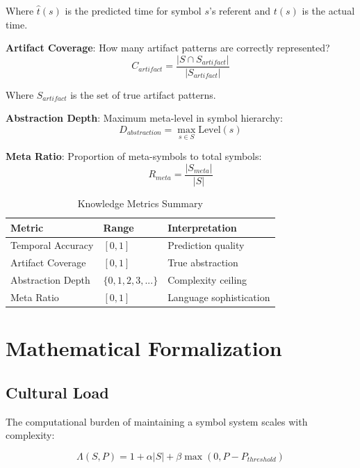 \documentclass[11pt,a4paper]{article}
\begin{document}
Where $\hat{t}(s)$ is the predicted time for symbol $s$'s referent and $t(s)$ is the actual time.

\textbf{Artifact Coverage}: How many artifact patterns are correctly represented?
\begin{equation}
C_{artifact} = \frac{|S \cap S_{artifact}|}{|S_{artifact}|}
\end{equation}

Where $S_{artifact}$ is the set of true artifact patterns.

\textbf{Abstraction Depth}: Maximum meta-level in symbol hierarchy:
\begin{equation}
D_{abstraction} = \max_{s \in S} \text{Level}(s)
\end{equation}

\textbf{Meta Ratio}: Proportion of meta-symbols to total symbols:
\begin{equation}
R_{meta} = \frac{|S_{meta}|}{|S|}
\end{equation}

\begin{table}[htbp]
\centering
\caption{Knowledge Metrics Summary}
\label{tab:knowledge_metrics}
\begin{tabular}{@{}lll@{}}
\toprule
\textbf{Metric} & \textbf{Range} & \textbf{Interpretation} \\
\midrule
Temporal Accuracy & $[0, 1]$ & Prediction quality \\
Artifact Coverage & $[0, 1]$ & True abstraction \\
Abstraction Depth & $\{0, 1, 2, 3, ...\}$ & Complexity ceiling \\
Meta Ratio & $[0, 1]$ & Language sophistication \\
\bottomrule
\end{tabular}
\end{table}

\section{Mathematical Formalization}

\subsection{Cultural Load}

The computational burden of maintaining a symbol system scales with complexity:

\begin{equation}
\Lambda(S, P) = 1 + \alpha |S| + \beta \max(0, P - P_{threshold})
\end{equation}
\end{document}
